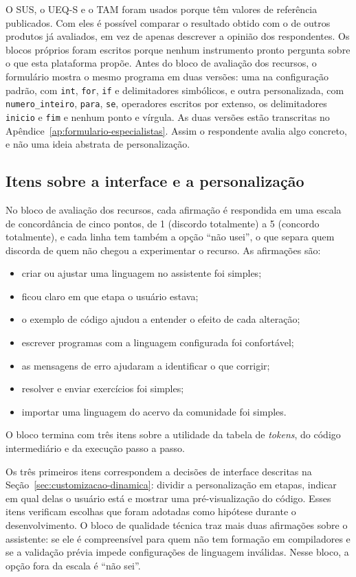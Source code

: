 O SUS, o UEQ-S e o TAM foram usados porque têm valores de referência publicados. Com eles é possível comparar o resultado obtido com o de outros produtos já avaliados, em vez de apenas descrever a opinião dos respondentes. Os blocos próprios foram escritos porque nenhum instrumento pronto pergunta sobre o que esta plataforma propõe. Antes do bloco de avaliação dos recursos, o formulário mostra o mesmo programa em duas versões: uma na configuração padrão, com \texttt{int}, \texttt{for}, \texttt{if} e delimitadores simbólicos, e outra personalizada, com \texttt{numero\_inteiro}, \texttt{para}, \texttt{se}, operadores escritos por extenso, os delimitadores \texttt{inicio} e \texttt{fim} e nenhum ponto e vírgula. As duas versões estão transcritas no Apêndice~\ref{ap:formulario-especialistas}. Assim o respondente avalia algo concreto, e não uma ideia abstrata de personalização.

\subsection{Itens sobre a interface e a personalização}

No bloco de avaliação dos recursos, cada afirmação é respondida em uma escala de concordância de cinco pontos, de 1 (discordo totalmente) a 5 (concordo totalmente), e cada linha tem também a opção ``não usei'', o que separa quem discorda de quem não chegou a experimentar o recurso. As afirmações são:

\begin{itemize}
    \item criar ou ajustar uma linguagem no assistente foi simples;
    \item ficou claro em que etapa o usuário estava;
    \item o exemplo de código ajudou a entender o efeito de cada alteração;
    \item escrever programas com a linguagem configurada foi confortável;
    \item as mensagens de erro ajudaram a identificar o que corrigir;
    \item resolver e enviar exercícios foi simples;
    \item importar uma linguagem do acervo da comunidade foi simples.
\end{itemize}
 O bloco termina com três itens sobre a utilidade da tabela de \textit{tokens}, do código intermediário e da execução passo a passo.

Os três primeiros itens correspondem a decisões de interface descritas na Seção~\ref{sec:customizacao-dinamica}: dividir a personalização em etapas, indicar em qual delas o usuário está e mostrar uma pré-visualização do código. Esses itens verificam escolhas que foram adotadas como hipótese durante o desenvolvimento. O bloco de qualidade técnica traz mais duas afirmações sobre o assistente: se ele é compreensível para quem não tem formação em compiladores e se a validação prévia impede configurações de linguagem inválidas. Nesse bloco, a opção fora da escala é ``não sei''.

